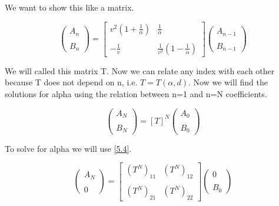 We want to show this like a matrix.

\begin{equation}
  \label{5.8}
  \left(\begin{array}{c}
    A_n
    \\

    \\
    B_n
  \end{array}
  \right) =
  \left[
    \begin{array}{cc}
      v^2(1+\frac{1}{\alpha}) & \frac{1}{\alpha}
      \\

      \\
      -\frac{1}{v} & \frac{1}{v^2}(1-\frac{1}{\alpha})
    \end{array}
  \right]
  \left(\begin{array}{c}
    A_{n-1}
    \\

    \\
    B_{n-1}
  \end{array}
  \right)
\end{equation}

We will called this matrix T. Now we can relate any index with each other because T does not depend on n, i.e. $T = T(\alpha,d)$. Now we will find the solutions for alpha using the relation between n=1 and n=N coefficients.

\begin{equation}
  \label{5.9}
  \left(\begin{array}{c}
    A_N
    \\

    \\
    B_N
  \end{array}
  \right) =
  \left[
    T
  \right]^N
  \left(\begin{array}{c}
    A_{0}
    \\

    \\
    B_{0}
  \end{array}
  \right)
\end{equation}

To solve for alpha we will use \ref{5.4}.

\begin{equation}
  \label{5.10}
  \left(\begin{array}{c}
    A_N
    \\

    \\
    0
  \end{array}
  \right) =
  \left[
    \begin{array}{cc}
      (T^N)_{11} & (T^N)_{12}
      \\

      \\
      (T^N)_{21} & (T^N)_{22}
    \end{array}
  \right]
  \left(\begin{array}{c}
    0
    \\

    \\
    B_{0}
  \end{array}
  \right)
\end{equation}

